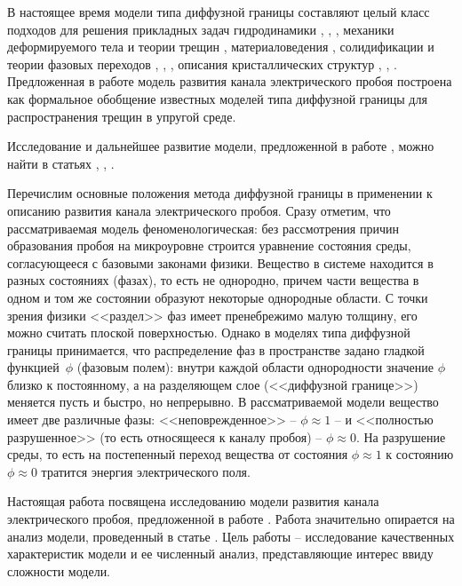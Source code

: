 \documentclass[a4paper,12pt]{article}
\theoremstyle{plain}
\theoremstyle{definition}
\begin{document}
В настоящее время модели типа диффузной границы составляют целый класс подходов для решения прикладных задач гидродинамики \cite{lamorgese_flow_modeling}, \cite{kim_fluid_flows}, \cite{xu_hydrodynamics}, механики деформируемого тела и теории трещин \cite{ambati_fracture}, материаловедения \cite{provatas_materials}, солидификации и теории фазовых переходов \cite{boettinger_solidification}, \cite{cartalade_phase_separation}, \cite{gransaly_solidification}, описания кристаллических структур \cite{emmerich_crystal}, \cite{asadi_crystal}, \cite{provatas_crystal}. Предложенная в работе \cite{pitike_dielectric_breakdown} модель развития канала электрического пробоя построена как формальное обобщение известных моделей типа диффузной границы для распространения трещин в упругой среде.

Исследование и дальнейшее развитие модели, предложенной в работе \cite{pitike_dielectric_breakdown}, можно найти в статьях \cite{zipunova_higher_codimension}, \cite{zipunova_conservative}, \cite{zipunova_thermomechanical}.

Перечислим основные положения метода диффузной границы в применении к описанию развития канала электрического пробоя. Сразу отметим, что рассматриваемая модель феноменологическая: без рассмотрения причин образования пробоя на микроуровне строится уравнение состояния среды, согласующееся с базовыми законами физики. Вещество в системе находится в разных состояниях (фазах), то есть не однородно, причем части вещества в одном и том же состоянии образуют некоторые однородные области. С точки зрения физики <<раздел>> фаз имеет пренебрежимо малую толщину, его можно считать плоской поверхностью. Однако в моделях типа диффузной границы принимается, что распределение фаз в пространстве задано гладкой функцией~$\phi$ (фазовым полем): внутри каждой области однородности значение $\phi$ близко к постоянному, а на разделяющем слое (<<диффузной границе>>) меняется пусть и быстро, но непрерывно. В рассматриваемой модели вещество имеет две различные фазы: <<неповрежденное>> -- $\phi \approx 1$ -- и <<полностью разрушенное>> (то есть относящееся к каналу пробоя) -- $\phi \approx 0$. На разрушение среды, то есть на постепенный переход вещества от состояния $\phi \approx 1$ к состоянию $\phi \approx 0$ тратится энергия электрического поля.

Настоящая работа посвящена исследованию модели развития канала электрического пробоя, предложенной в работе \cite{pitike_dielectric_breakdown}. Работа значительно опирается на анализ модели, проведенный в статье \cite{zipunova_higher_codimension}. Цель работы -- исследование качественных характеристик модели и ее численный анализ, представляющие интерес ввиду сложности модели.
\end{document}
